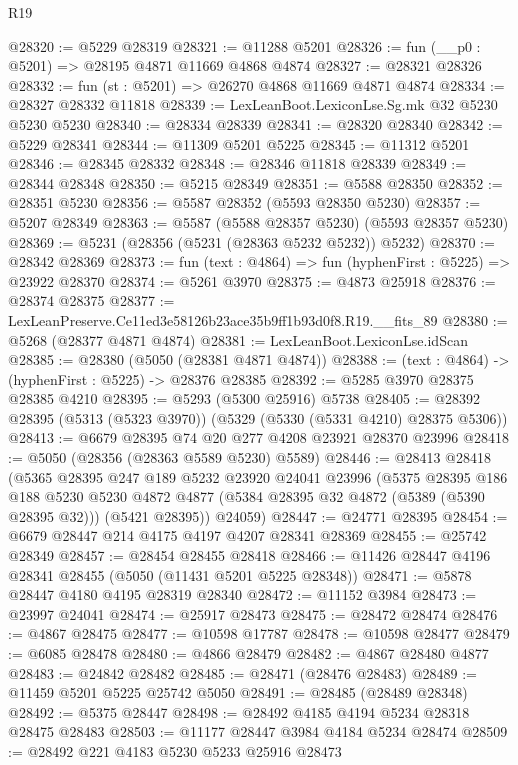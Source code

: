 \begin{lexlean}{R19}
\begin{coremodule}
@28320 := @5229 @28319
@28321 := @11288 @5201
@28326 := fun (__p0 : @5201) => @28195 @4871 @11669 @4868 @4874
@28327 := @28321 @28326
@28332 := fun (st : @5201) => @26270 @4868 @11669 @4871 @4874
@28334 := @28327 @28332 @11818
@28339 := LexLeanBoot.LexiconLse.Sg.mk @32 @5230 @5230 @5230
@28340 := @28334 @28339
@28341 := @28320 @28340
@28342 := @5229 @28341
@28344 := @11309 @5201 @5225
@28345 := @11312 @5201
@28346 := @28345 @28332
@28348 := @28346 @11818 @28339
@28349 := @28344 @28348
@28350 := @5215 @28349
@28351 := @5588 @28350
@28352 := @28351 @5230
@28356 := @5587 @28352 (@5593 @28350 @5230)
@28357 := @5207 @28349
@28363 := @5587 (@5588 @28357 @5230) (@5593 @28357 @5230)
@28369 := @5231 (@28356 (@5231 (@28363 @5232 @5232)) @5232)
@28370 := @28342 @28369
@28373 := fun (text : @4864) => fun (hyphenFirst : @5225) => @23922 @28370
@28374 := @5261 @3970
@28375 := @4873 @25918
@28376 := @28374 @28375
@28377 := LexLeanPreserve.Ce11ed3e58126b23ace35b9ff1b93d0f8.R19.__fits_89
@28380 := @5268 (@28377 @4871 @4874)
@28381 := LexLeanBoot.LexiconLse.idScan
@28385 := @28380 (@5050 (@28381 @4871 @4874))
@28388 := (text : @4864) -> (hyphenFirst : @5225) -> @28376 @28385
@28392 := @5285 @3970 @28375 @28385 @4210
@28395 := @5293 (@5300 @25916) @5738
@28405 := @28392 @28395 (@5313 (@5323 @3970)) (@5329 (@5330 (@5331 @4210) @28375 @5306))
@28413 := @6679 @28395 @74 @20 @277 @4208 @23921 @28370 @23996
@28418 := @5050 (@28356 (@28363 @5589 @5230) @5589)
@28446 := @28413
    @28418
    (@5365
      @28395
      @247
      @189
      @5232
      @23920
      @24041
      @23996
      (@5375
        @28395
        @186
        @188
        @5230
        @5230
        @4872
        @4877
        (@5384 @28395 @32 @4872 (@5389 (@5390 @28395 @32)))
        (@5421 @28395))
      @24059)
@28447 := @24771 @28395
@28454 := @6679 @28447 @214 @4175 @4197 @4207 @28341 @28369
@28455 := @25742 @28349
@28457 := @28454 @28455 @28418
@28466 := @11426 @28447 @4196 @28341 @28455 (@5050 (@11431 @5201 @5225 @28348))
@28471 := @5878 @28447 @4180 @4195 @28319 @28340
@28472 := @11152 @3984
@28473 := @23997 @24041
@28474 := @25917 @28473
@28475 := @28472 @28474
@28476 := @4867 @28475
@28477 := @10598 @17787
@28478 := @10598 @28477
@28479 := @6085 @28478
@28480 := @4866 @28479
@28482 := @4867 @28480 @4877
@28483 := @24842 @28482
@28485 := @28471 (@28476 @28483)
@28489 := @11459 @5201 @5225 @25742 @5050
@28491 := @28485 (@28489 @28348)
@28492 := @5375 @28447
@28498 := @28492 @4185 @4194 @5234 @28318 @28475 @28483
@28503 := @11177 @28447 @3984 @4184 @5234 @28474
@28509 := @28492 @221 @4183 @5230 @5233 @25916 @28473

\end{coremodule}
\end{lexlean}
